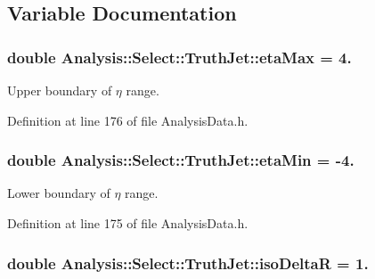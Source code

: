 \subsection{Variable Documentation}
\subsubsection[{\texorpdfstring{eta\+Max}{etaMax}}]{\setlength{\rightskip}{0pt plus 5cm}double Analysis\+::\+Select\+::\+Truth\+Jet\+::eta\+Max = 4.\hspace{0.3cm}{\ttfamily [static]}}\hypertarget{namespaceAnalysis_1_1Select_1_1TruthJet_a667ad09951ba9ba785549ec2e4a10770}{}\label{namespaceAnalysis_1_1Select_1_1TruthJet_a667ad09951ba9ba785549ec2e4a10770}


Upper boundary of $ \eta $ range. 



Definition at line 176 of file Analysis\+Data.\+h.

\subsubsection[{\texorpdfstring{eta\+Min}{etaMin}}]{\setlength{\rightskip}{0pt plus 5cm}double Analysis\+::\+Select\+::\+Truth\+Jet\+::eta\+Min = -\/4.\hspace{0.3cm}{\ttfamily [static]}}\hypertarget{namespaceAnalysis_1_1Select_1_1TruthJet_a37b231bdadb05d096c3542de8387283f}{}\label{namespaceAnalysis_1_1Select_1_1TruthJet_a37b231bdadb05d096c3542de8387283f}


Lower boundary of $ \eta $ range. 



Definition at line 175 of file Analysis\+Data.\+h.

\subsubsection[{\texorpdfstring{iso\+DeltaR}{isoDeltaR}}]{\setlength{\rightskip}{0pt plus 5cm}double Analysis\+::\+Select\+::\+Truth\+Jet\+::iso\+DeltaR = 1.\hspace{0.3cm}{\ttfamily [static]}}\hypertarget{namespaceAnalysis_1_1Select_1_1TruthJet_a194aba6714870814928ce1f6490f42cf}{}\label{namespaceAnalysis_1_1Select_1_1TruthJet_a194aba6714870814928ce1f6490f42cf}


